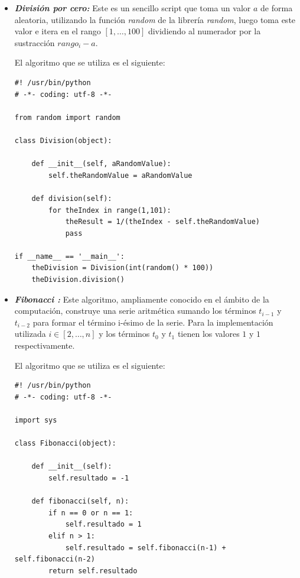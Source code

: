 \documentclass[12pt,legalpaper]{report}
\begin{document}
\begin{itemize}
	\item \textit{\textbf{División por cero:}} Este es un sencillo script que toma un valor $a$ de forma aleatoria, utilizando la función \textit{random} de la librería \textit{random}, luego toma este valor e itera en el rango $[1,\dots,100]$ dividiendo al numerador por la sustracción $rango_{i} - a$.
	
	El algoritmo que se utiliza es el siguiente:
	
\begin{singlespace}
\begin{lstlisting}[style=Python]
#! /usr/bin/python
# -*- coding: utf-8 -*-

from random import random

class Division(object):
    
    def __init__(self, aRandomValue):
        self.theRandomValue = aRandomValue
    
    def division(self):
        for theIndex in range(1,101):
            theResult = 1/(theIndex - self.theRandomValue)
            pass
        
if __name__ == '__main__':
    theDivision = Division(int(random() * 100))
    theDivision.division()
\end{lstlisting}
\end{singlespace}		
	
	\item \textit{\textbf{Fibonacci :}} Este algoritmo, ampliamente conocido en el ámbito de la computación, construye una serie aritmética sumando los términos $t_{i-1}$ y $t_{i-2}$ para formar el término i-ésimo de la serie.  Para la implementación utilizada $i \in [2,\dots,n]$ y los términos $t_{0}$ y $t_{1}$ tienen los valores $1$ y $1$ respectivamente.
	
	El algoritmo que se utiliza es el siguiente:
	
\begin{singlespace}
\begin{lstlisting}[style=Python]
#! /usr/bin/python
# -*- coding: utf-8 -*-

import sys

class Fibonacci(object):
    
    def __init__(self):
        self.resultado = -1
        
    def fibonacci(self, n):
        if n == 0 or n == 1:
            self.resultado = 1
        elif n > 1:
            self.resultado = self.fibonacci(n-1) + self.fibonacci(n-2)
        return self.resultado


\end{lstlisting}
\end{singlespace}
\end{itemize}
\end{document}
